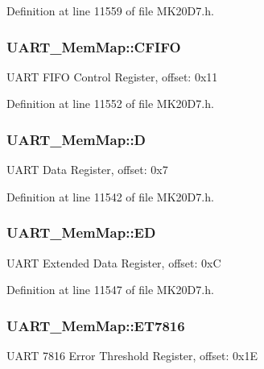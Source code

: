Definition at line 11559 of file M\+K20\+D7.\+h.

\subsubsection[{\texorpdfstring{C\+F\+I\+FO}{CFIFO}}]{ U\+A\+R\+T\+\_\+\+Mem\+Map\+::\+C\+F\+I\+FO}\hypertarget{struct_u_a_r_t___mem_map_a9f359b0d3af7e6bbdb3ae2cce221d879}{}\label{struct_u_a_r_t___mem_map_a9f359b0d3af7e6bbdb3ae2cce221d879}
U\+A\+RT F\+I\+FO Control Register, offset\+: 0x11 

Definition at line 11552 of file M\+K20\+D7.\+h.

\subsubsection[{\texorpdfstring{D}{D}}]{ U\+A\+R\+T\+\_\+\+Mem\+Map\+::D}\hypertarget{struct_u_a_r_t___mem_map_a3568c1640bf7dc0e1214cddcea1e8f0c}{}\label{struct_u_a_r_t___mem_map_a3568c1640bf7dc0e1214cddcea1e8f0c}
U\+A\+RT Data Register, offset\+: 0x7 

Definition at line 11542 of file M\+K20\+D7.\+h.

\subsubsection[{\texorpdfstring{ED}{ED}}]{ U\+A\+R\+T\+\_\+\+Mem\+Map\+::\+ED}\hypertarget{struct_u_a_r_t___mem_map_a0f318dc0e65102cb79566d2b22f064b2}{}\label{struct_u_a_r_t___mem_map_a0f318dc0e65102cb79566d2b22f064b2}
U\+A\+RT Extended Data Register, offset\+: 0xC 

Definition at line 11547 of file M\+K20\+D7.\+h.

\subsubsection[{\texorpdfstring{E\+T7816}{ET7816}}]{ U\+A\+R\+T\+\_\+\+Mem\+Map\+::\+E\+T7816}\hypertarget{struct_u_a_r_t___mem_map_a97cac628a8a40a8369eb7339bd12cb3f}{}\label{struct_u_a_r_t___mem_map_a97cac628a8a40a8369eb7339bd12cb3f}
U\+A\+RT 7816 Error Threshold Register, offset\+: 0x1E 

